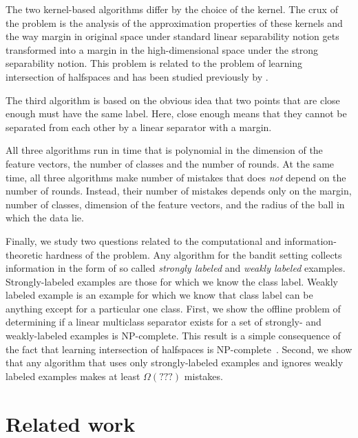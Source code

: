 \documentclass[12pt]{article}
\begin{document}
The two kernel-based algorithms differ by the choice of the kernel. The crux of
the problem is the analysis of the approximation properties of these kernels and
the way margin in original space under standard linear separability notion gets
transformed into a margin in the high-dimensional space under the strong
separability notion. This problem is related to the problem of learning
intersection of halfspaces and has been studied previously by
\cite{Klivans-Servedio-2008}.

The third algorithm is based on the obvious idea that two points that are close
enough must have the same label. Here, close enough means that they cannot be
separated from each other by a linear separator with a margin.

All three algorithms run in time that is polynomial in the dimension of the
feature vectors, the number of classes and the number of rounds. At the same
time, all three algorithms make number of mistakes that does \emph{not} depend
on the number of rounds. Instead, their number of mistakes depends only on the
margin, number of classes, dimension of the feature vectors, and the radius of
the ball in which the data lie.

Finally, we study two questions related to the computational and
information-theoretic hardness of the problem. Any algorithm for the bandit
setting collects information in the form of so called \emph{strongly labeled}
and \emph{weakly labeled} examples. Strongly-labeled examples are those for
which we know the class label. Weakly labeled example is an example for which we
know that class label can be anything except for a particular one class. First,
we show the offline problem of determining if a linear multiclass separator
exists for a set of strongly- and weakly-labeled examples is NP-complete. This
result is a simple consequence of the fact that learning intersection of
halfspaces is NP-complete~\citep{Blum-Rivest-1993}. Second, we show that any
algorithm that uses only strongly-labeled examples and ignores weakly labeled
examples makes at least $\Omega(???)$ mistakes.


\section{Related work}
\label{section:related-work}

\cite{Abernethy-Rakhlin-2009}

\cite{Hazan-Kale-2011}

\cite{Foster-Krishnamurthy-2018}
\end{document}
